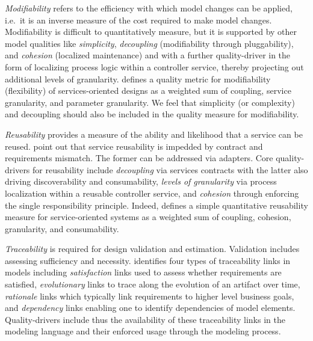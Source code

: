 \emph{Modifiability} refers to the efficiency with which model changes can be applied, i.e.\ it is an inverse measure of the cost required to make model changes. Modifiability is difficult to quantitatively measure, but it is supported by other model qualities like \emph{simplicity},  \emph{decoupling} (modifiability through pluggability), and \emph{cohesion} (localized maintenance) and with a further quality-driver in the form of localizing process logic within a controller service, thereby projecting out additional levels of granularity. \cite{shim_design_2008} defines a quality metric for modifiability (flexibility) of services-oriented designs as a weighted sum of coupling, service granularity, and parameter granularity. We feel that simplicity (or complexity) and decoupling should also be included in the quality measure for modifiability.

\emph{Reusability} provides a measure of the ability and likelihood that a service can be reused.  \cite{khoshkbarforoushha_metric_2010,choi_quality_2008,feuerlicht_determinants_2007}
\cite{khoshkbarforoushha_metric_2010} point out that service reusability is impedded by contract and requirements mismatch. The former can be addressed via adapters. Core quality-drivers for reusability include \emph{decoupling} via services contracts with the latter also driving discoverability and consumability, \emph{levels of granularity} via process localization within a reusable controller service, and \emph{cohesion} through enforcing the single responsibility principle. Indeed, \cite{shim_design_2008} defines a simple quantitative reusability measure for service-oriented systems as a weighted sum of coupling, cohesion, granularity, and consumability.

\emph{Traceability} is required for design validation and estimation. Validation includes assessing sufficiency and necessity. \cite{ramesh_toward_2001} identifies four types of traceability links in models including \emph{satisfaction} links used to assess whether requirements are satisfied, \emph{evolutionary} links to trace along the evolution of an artifact over time, \emph{rationale} links which typically link requirements to higher level business goals, and \emph{dependency} links enabling one to identify dependencies of model elements. Quality-drivers include thus the availability of these traceability links in the modeling language and their enforced usage through the modeling process.